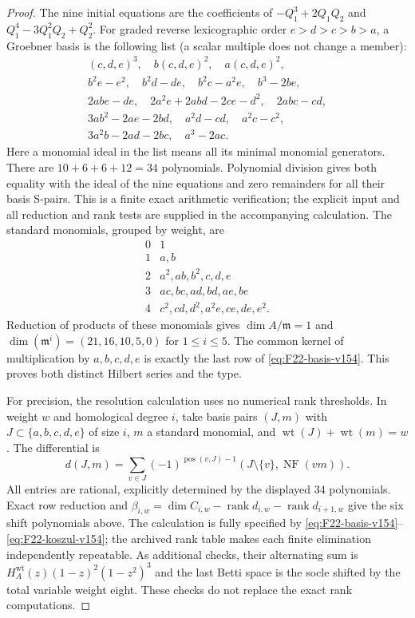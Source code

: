 \documentclass[11pt,reqno]{amsart}
\numberwithin{equation}{section}
\theoremstyle{definition}\newtheorem{definition}[theorem]{Definition}
\theoremstyle{remark}\newtheorem{remark}[theorem]{Remark}
\DeclareMathOperator{\rank}{rank}\DeclareMathOperator{\Proj}{Proj}
\begin{document}
\begin{proof}
The nine initial equations are the coefficients of
$-Q_1^3+2Q_1Q_2$ and $Q_1^4-3Q_1^2Q_2+Q_2^2$.
For graded reverse lexicographic order $e>d>c>b>a$, a Groebner basis
is the following list (a scalar multiple does not change a member):
\begin{gather*}
 (c,d,e)^3,\quad b(c,d,e)^2,\quad a(c,d,e)^2,\\
 b^2e-e^2,\quad b^2d-de,\quad b^2c-a^2e,\quad b^3-2be,\\
 2abe-de,\quad 2a^2e+2abd-2ce-d^2,\quad 2abc-cd,\\
 3ab^2-2ae-2bd,\quad a^2d-cd,\quad a^2c-c^2,\\
 3a^2b-2ad-2bc,\quad a^3-2ac.
\end{gather*}
Here a monomial ideal in the list means all its minimal monomial
generators. There are $10+6+6+12=34$ polynomials. Polynomial
division gives both equality with the ideal of the nine equations
and zero remainders for all their basis S-pairs. This is a finite
exact arithmetic verification; the explicit input and all reduction
and rank tests are supplied in the accompanying calculation.
The standard monomials, grouped by weight, are
\begin{equation}\label{eq:F22-basis-v154}
\begin{array}{c|l}
0&1\\
1&a,b\\
2&a^2,ab,b^2,c,d,e\\
3&ac,bc,ad,bd,ae,be\\
4&c^2,cd,d^2,a^2e,ce,de,e^2.
\end{array}
\end{equation}
Reduction of products of these monomials gives
$\dim A/\mathfrak m=1$ and
$\dim(\mathfrak m^i)=(21,16,10,5,0)$ for $1\leq i\leq5$.
The common kernel of multiplication by $a,b,c,d,e$ is exactly the
last row of \eqref{eq:F22-basis-v154}. This proves both distinct
Hilbert series and the type.

For precision, the resolution calculation uses no numerical rank
thresholds. In weight $w$ and homological degree $i$, take basis
pairs $(J,m)$ with $J\subset\{a,b,c,d,e\}$ of size $i$, $m$ a
standard monomial, and $\operatorname{wt}(J)+\operatorname{wt}(m)=w$.
The differential is
\begin{equation}\label{eq:F22-koszul-v154}
 d(J,m)=\sum_{v\in J}(-1)^{\operatorname{pos}(v,J)-1}
                  (J\setminus\{v\},\operatorname{NF}(vm)).
\end{equation}
All entries are rational, explicitly determined by the displayed
34 polynomials. Exact row reduction and
$\beta_{i,w}=\dim C_{i,w}-\rank d_{i,w}-\rank d_{i+1,w}$ give the
six shift polynomials above. The calculation is fully specified by
\eqref{eq:F22-basis-v154}--\eqref{eq:F22-koszul-v154}; the archived
rank table makes each finite elimination independently repeatable.
As additional checks, their alternating sum is
$H_A^{\mathrm{wt}}(z)(1-z)^2(1-z^2)^3$ and the last Betti space is
the socle shifted by the total variable weight eight. These checks
do not replace the exact rank computations.
\end{proof}
\end{document}
